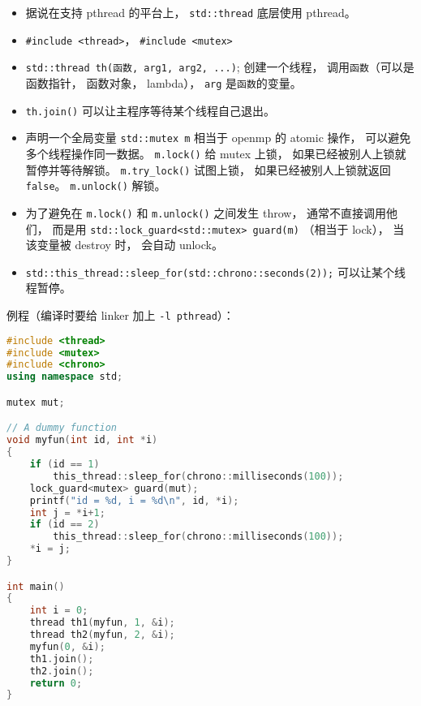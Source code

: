 
\begin{itemize}
\item 据说在支持 pthread 的平台上， \verb|std::thread| 底层使用 pthread。
\item \verb|#include <thread>|， \verb|#include <mutex>|
\item \verb|std::thread th(函数, arg1, arg2, ...)|; 创建一个线程， 调用\verb|函数|（可以是函数指针， 函数对象， lambda）， \verb|arg| 是\verb|函数|的变量。
\item \verb|th.join()| 可以让主程序等待某个线程自己退出。
\item 声明一个全局变量 \verb|std::mutex m| 相当于 openmp 的 atomic 操作， 可以避免多个线程操作同一数据。 \verb|m.lock()| 给 mutex 上锁， 如果已经被别人上锁就暂停并等待解锁。 \verb|m.try_lock()| 试图上锁， 如果已经被别人上锁就返回 \verb|false|。 \verb|m.unlock()| 解锁。
\item 为了避免在 \verb|m.lock()| 和 \verb|m.unlock()| 之间发生 throw， 通常不直接调用他们， 而是用 \verb|std::lock_guard<std::mutex> guard(m)| （相当于 lock）， 当该变量被 destroy 时， 会自动 unlock。
\item \verb|std::this_thread::sleep_for(std::chrono::seconds(2));| 可以让某个线程暂停。
\end{itemize}

例程（编译时要给 linker 加上 \verb|-l pthread|）：
\begin{lstlisting}[language=cpp]
#include <thread>
#include <mutex>
#include <chrono>
using namespace std;

mutex mut;

// A dummy function
void myfun(int id, int *i)
{
    if (id == 1)
        this_thread::sleep_for(chrono::milliseconds(100));
    lock_guard<mutex> guard(mut);
    printf("id = %d, i = %d\n", id, *i);
    int j = *i+1;
    if (id == 2)
        this_thread::sleep_for(chrono::milliseconds(100));
    *i = j;
}

int main()
{
    int i = 0;
    thread th1(myfun, 1, &i);
    thread th2(myfun, 2, &i);
    myfun(0, &i);
    th1.join();
    th2.join();
    return 0;
}
\end{lstlisting}

